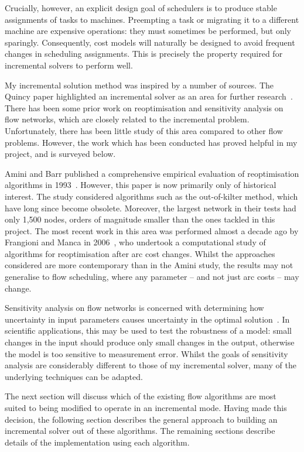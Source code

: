 Crucially, however, an explicit design goal of schedulers is to produce stable assignments of tasks to machines. Preempting a task or migrating it to a different machine are expensive operations: they must sometimes be performed, but only sparingly. Consequently, cost models will naturally be designed to avoid frequent changes in scheduling assignments. This is precisely the property required for incremental solvers to perform well.

My incremental solution method was inspired by a number of sources. The Quincy paper highlighted an incremental solver as an area for further research~\cite[\S6.5]{Isard:2007}. There has been some prior work on reoptimisation and sensitivity analysis on flow networks, which are closely related to the incremental problem. Unfortunately, there has been little study of this area compared to other flow problems. However, the work which has been conducted has proved helpful in my project, and is surveyed below.

Amini and Barr published a comprehensive empirical evaluation of reoptimisation algorithms in 1993~\cite{Amini:1993}. However, this paper is now primarily only of historical interest. The study considered algorithms such as the out-of-kilter method, which have long since become obsolete. Moreover, the largest network in their tests had only 1,500 nodes, orders of magnitude smaller than the ones tackled in this project. The most recent work in this area was performed almost a decade ago by Frangioni and Manca in 2006~\cite{Frangioni:2006}, who undertook a computational study of algorithms for reoptimisation after arc cost changes. Whilst the approaches considered are more contemporary than in the Amini study, the results may not generalise to flow scheduling, where any parameter -- and not just arc costs -- may change. 

Sensitivity analysis on flow networks is concerned with determining how uncertainty in input parameters causes uncertainty in the optimal solution~\cite[\S9.11]{Ahuja:1993}. In scientific applications, this may be used to test the robustness of a model: small changes in the input should produce only small changes in the output, otherwise the model is too sensitive to measurement error. Whilst the goals of sensitivity analysis are considerably different to those of my incremental solver, many of the underlying techniques can be adapted.

The next section will discuss which of the existing flow algorithms are most suited to being modified to operate in an incremental mode. Having made this decision, the following section describes the general approach to building an incremental solver out of these algorithms. The remaining sections describe details of the implementation using each algorithm.

